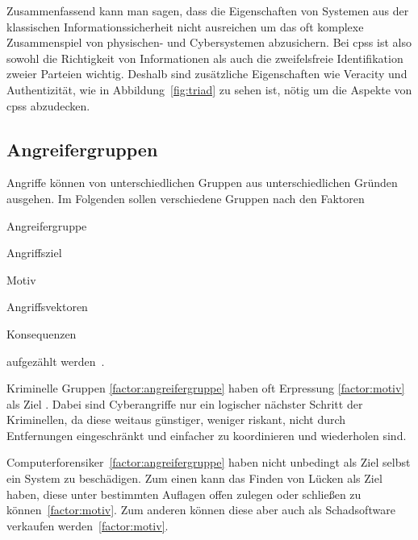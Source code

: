 \documentclass[final,bibliography=totocnumbered]{include/sikseminar}
\newcommand{\cps}{\glspl{cps}\xspace}
\begin{document}
Zusammenfassend kann man sagen, dass die Eigenschaften von Systemen aus der klassischen Informationssicherheit nicht ausreichen um das oft komplexe Zusammenspiel von physischen- und Cybersystemen abzusichern.
Bei \cps ist also sowohl die Richtigkeit von Informationen als auch die zweifelsfreie Identifikation zweier Parteien wichtig.
Deshalb sind zusätzliche Eigenschaften wie Veracity und Authentizität, wie in Abbildung~\ref{fig:triad} zu sehen ist, nötig um die Aspekte von \cps abzudecken.


\subsection{Angreifergruppen}\label{subsec:angreifergruppen}

Angriffe können von unterschiedlichen Gruppen aus unterschiedlichen Gründen ausgehen.
Im Folgenden sollen verschiedene Gruppen nach den Faktoren
\begin{enumerate*}[label=(\alph*),before=\unskip{: }, itemjoin={{; }}, itemjoin*={{, und }}]
    \item Angreifergruppe\label{factor:angreifergruppe}
    \item Angriffsziel\label{factor:target}
    \item Motiv\label{factor:motiv}
    \item Angriffsvektoren\label{factor:methode}
    \item Konsequenzen\label{factor:konsequenz}
\end{enumerate*} aufgezählt werden~\cite{HLL+17}.

Kriminelle Gruppen \ref{factor:angreifergruppe} haben oft Erpressung \ref{factor:motiv} als Ziel \cite{WYX+10}.
Dabei sind Cyberangriffe nur ein logischer nächster Schritt der Kriminellen, da diese weitaus günstiger, weniger riskant, nicht durch Entfernungen eingeschränkt und einfacher zu koordinieren und wiederholen sind. \cite{CAS+09}

Computerforensiker~\ref{factor:angreifergruppe} haben nicht unbedingt als Ziel selbst ein System zu beschädigen.
Zum einen kann das Finden von Lücken als Ziel haben, diese unter bestimmten Auflagen offen zulegen oder schließen zu können~\ref{factor:motiv}. 
Zum anderen können diese aber auch als Schadsoftware verkaufen werden~\ref{factor:motiv}. 
\end{document}
